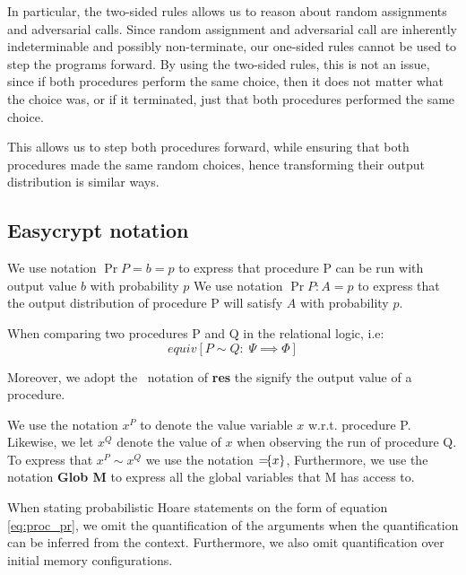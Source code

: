 In particular, the two-sided rules allows us to reason about random assignments
and adversarial calls.
Since random assignment and adversarial call are inherently indeterminable and possibly
non-terminate, our one-sided rules cannot be used to step the programs forward.
By using the two-sided rules, this is not an issue,
since if both procedures perform the same choice, then it does not
matter what the choice was, or if it terminated, just that both procedures
performed the same choice.

This allows us to step both procedures forward, while ensuring that both
procedures made the same random choices, hence transforming their output
distribution is similar ways.

\subsection{Easycrypt notation}
\label{sec:label}

We use notation $\Pr{P = b} = p$ to express that procedure P can be run with
output value $b$ with probability $p$
We use notation $\Pr{P : A} = p$ to express that the output distribution of
procedure P will satisfy $A$ with probability $p$.

When comparing two procedures P and Q in the relational logic, i.e:
\[
  equiv[P \sim Q :\; \Psi \implies \Phi]
\]

Moreover, we adopt the \easycrypt\ notation of \textbf{res} the signify the
output value of a procedure.

We use the notation $x^{P}$ to denote the value variable $x$ w.r.t. procedure P.
Likewise, we let $x^{Q}$ denote the value of $x$ when observing the run of
procedure Q. To express that $x^{P} \sim x^{Q}$ we use the notation ${=}\!\{x\}$,
Furthermore, we use the notation \textbf{Glob M} to express all the global
variables that M has access to.

When stating probabilistic Hoare statements on the form of equation
\ref{eq:proc_pr}, we omit the quantification of the arguments when the
quantification can be inferred from the context. Furthermore, we also omit
quantification over initial memory configurations.

